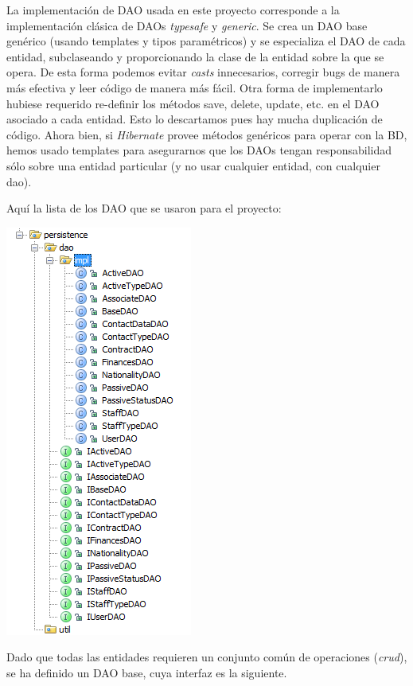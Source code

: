 \documentclass[letter]{article}
\begin{document}
La implementación de DAO usada en este proyecto corresponde a la implementación clásica de DAOs \textit{typesafe} y \textit{generic}. Se crea un DAO base genérico (usando templates y tipos paramétricos) y se especializa el DAO de cada entidad, subclaseando y proporcionando la clase de la entidad sobre la que se opera. De esta forma podemos evitar \textit{casts} innecesarios, corregir bugs de manera más efectiva y leer código de manera más fácil. Otra forma de implementarlo hubiese requerido re-definir los métodos save, delete, update, etc. en el DAO asociado a cada entidad. Esto lo descartamos pues hay mucha duplicación de código. Ahora bien, si \textit{Hibernate} provee métodos genéricos para operar con la BD, hemos usado templates para asegurarnos que los DAOs tengan responsabilidad sólo sobre una entidad particular (y no usar cualquier entidad, con cualquier dao).

Aquí la lista de los DAO que se usaron para el proyecto:

\begin{center}
  \includegraphics{images/daos.png}
\end{center}

Dado que todas las entidades requieren un conjunto común de operaciones (\textit{crud}), se ha definido un DAO base, cuya interfaz es la siguiente.
\end{document}
